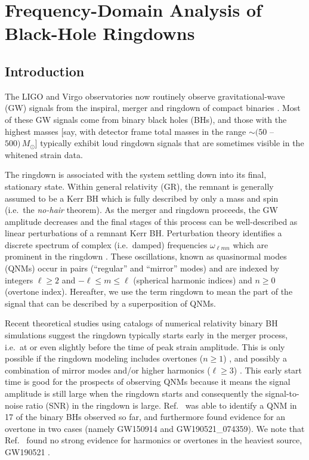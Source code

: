 
\chapter{Frequency-Domain Analysis of Black-Hole Ringdowns}

\label{Chapter3}

\section{Introduction}\label{sec:introduction}

The LIGO \cite{LIGOScientific:2014pky} and Virgo \cite{VIRGO:2014yos} observatories now routinely observe gravitational-wave (GW) signals from the inspiral, merger and ringdown of compact binaries \cite{LIGOScientific:2018mvr, LIGOScientific:2020ibl}.
Most of these GW signals come from binary black holes (BHs), and those with the highest masses [say, with detector frame total masses in the range $\sim (50$ -- $500)\,M_\odot$] typically exhibit loud ringdown signals that are sometimes visible in the whitened strain data.

The ringdown is associated with the system settling down into its final, stationary state.
Within general relativity (GR), the remnant is generally assumed to be a Kerr BH which is fully described by only a mass and spin (i.e.\ the \emph{no-hair} theorem).
As the merger and ringdown proceeds, the GW amplitude decreases and the final stages of this process can be well-described as linear perturbations of a remnant Kerr BH.
Perturbation theory identifies a discrete spectrum of complex (i.e.\ damped) frequencies $\omega_{\ell m n}$ which are prominent in the ringdown \cite{Berti:2009kk}.
These oscillations, known as quasinormal modes (QNMs) occur in pairs (``regular'' and ``mirror'' modes) and are indexed by integers $\ell \geq 2$ and $-\ell \leq m \leq \ell$ (spherical harmonic indices) and $n \geq 0$ (overtone index).
Hereafter, we use the term ringdown to mean the part of the signal that can be described by a superposition of QNMs.

Recent theoretical studies using catalogs of numerical relativity binary BH simulations suggest the ringdown typically starts early in the merger process, i.e.\ at or even slightly before the time of peak strain amplitude. 
This is only possible if the ringdown modeling includes overtones ($n \geq 1$) \cite{Giesler:2019uxc, JimenezForteza:2020cve, Forteza:2021wfq}, and possibly a combination of mirror modes and/or higher harmonics ($\ell\geq 3$) \cite{Cook:2020otn, Dhani:2020nik, Finch:2021iip}.
This early start time is good for the prospects of observing QNMs because it means the signal amplitude is still large when the ringdown starts and consequently the signal-to-noise ratio (SNR) in the ringdown is large.
Ref.~\cite{LIGOScientific:2020tif} was able to identify a QNM in 17 of the binary BHs observed so far, and furthermore found evidence for an overtone in two cases (namely GW150914 \cite{LIGOScientific:2016aoc} and GW190521\_074359).
We note that Ref.~\cite{LIGOScientific:2020tif} found no strong evidence for harmonics or overtones in the heaviest source, GW190521 \cite{LIGOScientific:2020iuh}.

